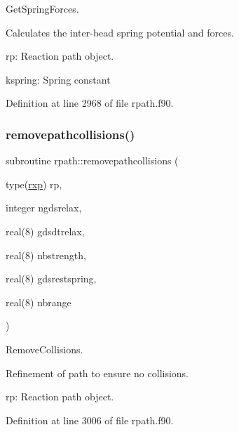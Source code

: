 Get\+Spring\+Forces. 

Calculates the inter-\/bead spring potential and forces.


\begin{DoxyItemize}
\item rp\+: Reaction path object.
\item kspring\+: Spring constant 
\end{DoxyItemize}

Definition at line 2968 of file rpath.\+f90.

\mbox{\label{namespacerpath_a89297ca90bf4171b4d1ac5a941e80a50}} 
\subsubsection{\texorpdfstring{removepathcollisions()}{removepathcollisions()}}
{\footnotesize\ttfamily subroutine rpath\+::removepathcollisions (\begin{DoxyParamCaption}\item[{type(\mbox{\hyperlink{structrpath_1_1rxp}{rxp}})}]{rp,  }\item[{integer}]{ngdsrelax,  }\item[{real(8)}]{gdsdtrelax,  }\item[{real(8)}]{nbstrength,  }\item[{real(8)}]{gdsrestspring,  }\item[{real(8)}]{nbrange }\end{DoxyParamCaption})}



Remove\+Collisions. 

Refinement of path to ensure no collisions.


\begin{DoxyItemize}
\item rp\+: Reaction path object. 
\end{DoxyItemize}

Definition at line 3006 of file rpath.\+f90.

\mbox{\label{namespacerpath_a75785c13dc36360c86c2ef8e8dd11fad}} 
